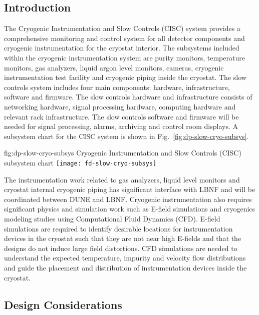 \subsection{Introduction}
\label{sec:fddp-slow-cryo-intro}


The Cryogenic Instrumentation and Slow Controls (CISC) system provides a comprehensive monitoring and control system for all detector components and cryogenic instrumentation for the cryostat interior. The subsystems included within the cryogenic instrumentation system are purity monitors, temperature monitors, gas analyzers, liquid argon level monitors, cameras, cryogenic instrumentation test facility and cryogenic piping inside the cryostat. The slow controls system includes four main components: hardware, infrastructure, software and firmware. The slow controls hardware and infrastructure consists of networking hardware, signal processing hardware, computing hardware and relevant rack infrastructure. The slow controls software and firmware will be needed for signal processing, alarms, archiving and control room displays. A subsystem chart for the CISC system is shown in Fig.\ \ref{fig:dp-slow-cryo-subsys}.

\begin{dunefigure}{fig:dp-slow-cryo-subsys}
{Cryogenic Instrumentation and Slow Controls (CISC) subsystem chart}
\texttt{[image: fd-slow-cryo-subsys]}
\end{dunefigure}

The instrumentation work related to gas analyzers, liquid level
monitors and cryostat internal cryogenic piping has significant
interface with LBNF and will be coordinated between DUNE and LBNF.
Cryogenic instrumentation also requires significant physics and
simulation work such as E-field simulations and cryogenics modeling
studies using Computational Fluid Dynamics (CFD). E-field simulations
are required to identify desirable locations for instrumentation
devices in the cryostat such that they are not near high E-fields and
that the designs do not induce large field distortions. CFD
simulations are needed to understand the expected temperature,
impurity and velocity flow distributions and guide the placement and
distribution of instrumentation devices inside the cryostat.


\subsection{Design Considerations}
\label{sec:fddp-slow-cryo-des-consid}

